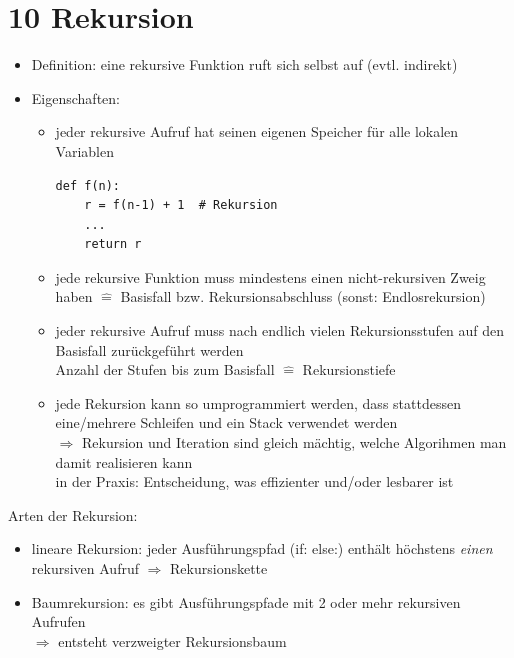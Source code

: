 

\chapter*{10 Rekursion}
\begin{itemize}[label={}]
    \item \hspace*{-1cm} Definition: eine rekursive Funktion ruft sich selbst auf (evtl. indirekt)
    \item \hspace*{-1cm} Eigenschaften:
    \begin{itemize}
        \item jeder rekursive Aufruf hat seinen eigenen Speicher für alle lokalen Variablen
        \begin{verbatim}
def f(n):
    r = f(n-1) + 1  # Rekursion
    ...
    return r
        \end{verbatim}
        \item jede rekursive Funktion muss mindestens einen nicht-rekursiven Zweig haben $\widehat{=}$ Basisfall bzw. Rekursionsabschluss (sonst: Endlosrekursion)
        \item jeder rekursive Aufruf muss nach endlich vielen Rekursionsstufen auf den Basisfall zurückgeführt werden \\
        Anzahl der Stufen bis zum Basisfall $\widehat{=}$ Rekursionstiefe
        \item jede Rekursion kann so umprogrammiert werden, dass stattdessen eine/mehrere Schleifen und ein Stack verwendet werden \\
        $\Rightarrow$ Rekursion und Iteration sind gleich mächtig, welche Algorihmen man damit realisieren kann \\
        in der Praxis: Entscheidung, was effizienter und/oder lesbarer ist
    \end{itemize}
\end{itemize}

Arten der Rekursion:
\begin{itemize}
    \item lineare Rekursion: jeder Ausführungspfad (if: else:) enthält höchstens \emph{einen} rekursiven Aufruf $\Rightarrow$ Rekursionskette
    \item Baumrekursion: es gibt Ausführungspfade mit 2 oder mehr rekursiven Aufrufen \\
    $\Rightarrow$ entsteht verzweigter Rekursionsbaum
\end{itemize}

